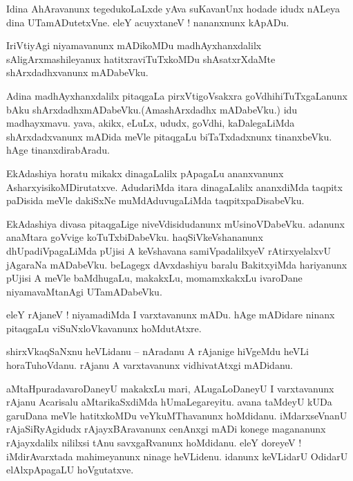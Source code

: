 \documentclass{article}
\begin{document}
\begin{mn}%
Idina AhAravanunx tegedukoLaLxde yAva suKavanUnx hodade idudx nALeya dina UTamADutetxVne. eleY 
acuyxtaneV ! nananxnunx kApADu.
\end{mn}

\begin{mn}%
IriVtiyAgi niyamavanunx mADikoMDu madhAyxhanxdalilx sAligArxmashileyanux hatitxraviTuTxkoMDu 
shAsatxrXdaMte shArxdadhxvanunx mADabeVku.
\end{mn}

\begin{mn}%
Adina madhAyxhanxdalilx pitaqgaLa pirxVtigoVsakxra goVdhihiTuTxgaLanunx bAku 
shArxdadhxmADabeVku.(AmashArxdadhx mADabeVku.) idu madhayxmavu. yava, akikx, eLuLx, ududx, goVdhi, 
kaDalegaLiMda shArxdadxvanunx mADida meVle pitaqgaLu biTaTxdadxnunx tinanxbeVku. hAge 
tinanxdirabAradu.
\end{mn}

\begin{mn}%
EkAdashiya horatu mikakx dinagaLalilx pApagaLu ananxvanunx AsharxyisikoMDirutatxve. AdudariMda 
itara dinagaLalilx ananxdiMda taqpitx paDisida meVle dakiSxNe muMdAduvugaLiMda taqpitxpaDisabeVku.
\end{mn}

\begin{mn}%
EkAdashiya divasa pitaqgaLige niveVdisidudanunx mUsinoVDabeVku. adanunx anaMtara goVvige 
koTuTxbiDabeVku. haqSiVkeVshananunx dhUpadiVpagaLiMda pUjisi A keVshavana samiVpadalilxyeV 
rAtirxyelalxvU jAgaraNa mADabeVku. beLagegx dAvxdashiyu baralu BakitxyiMda hariyanunx pUjisi A 
meVle baMdhugaLu, makakxLu, momamxkakxLu ivaroDane niyamavaMtanAgi UTamADabeVku.
\end{mn}

\begin{mn}%
eleY rAjaneV ! niyamadiMda I varxtavanunx mADu. hAge mADidare ninanx pitaqgaLu viSuNxloVkavanunx 
hoMdutAtxre.
\end{mn}

\begin{mn}%
shirxVkaqSaNxnu heVLidanu -- nAradanu A rAjanige hiVgeMdu heVLi horaTuhoVdanu. rAjanu A 
varxtavanunx vidhivatAtxgi mADidanu.
\end{mn}

\begin{mn}%
aMtaHpuradavaroDaneyU makakxLu mari, ALugaLoDaneyU I varxtavanunx rAjanu Acarisalu aMtarikaSxdiMda 
hUmaLegareyitu. avana taMdeyU kUDa garuDana meVle hatitxkoMDu veYkuMThavanunx hoMdidanu. 
iMdarxseVnanU rAjaSiRyAgidudx rAjayxBAravanunx cenAnxgi mADi konege magananunx rAjayxdalilx 
nililxsi tAnu savxgaRvanunx hoMdidanu. eleY doreyeV ! iMdirAvarxtada mahimeyanunx ninage 
heVLidenu. idanunx keVLidarU OdidarU elAlxpApagaLU hoVgutatxve.
\end{mn}
\end{document}
